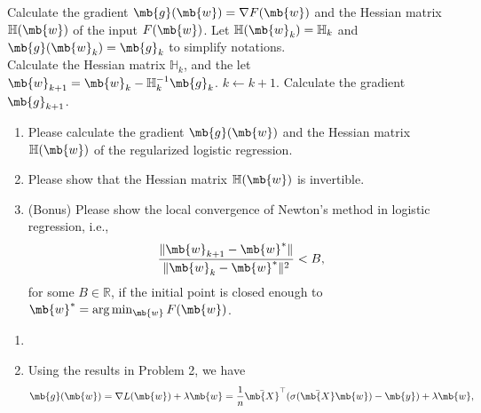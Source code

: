 \begin{exercise}
\begin{enumerate}
\begin{center}
\begin{minipage}{0.9\linewidth}
\begin{algorithm}[H]
                        \begin{algorithmic}[1]
                            \STATE Calculate the gradient $\mb{g}(\mb{w})=\nabla F(\mb{w})$ and the Hessian matrix $\mathbb{H}(\mb{w})$ of the input $F(\mb{w})$.
                            \STATE Let $\mathbb{H}(\mb{w}_k)=\mathbb{H}_{k}$ and $\mb{g}(\mb{w}_k)=\mb{g}_k$ to simplify notations. \\
                            Calculate the Hessian matrix $\mathbb{H}_k$, and the let $\mb{w}_{k+1}=\mb{w}_k-\mathbb{H}^{-1}_{k}\mb{g}_k$.
                            \STATE $k\leftarrow k+1$.
                            \STATE Calculate the gradient $\mb{g}_{k+1}$.
                            \ENDWHILE
                        \end{algorithmic}
                    \end{algorithm}
                \end{minipage}
            \end{center}
            \begin{enumerate}
                \item Please calculate the gradient $\mb{g}(\mb{w})$ and the Hessian matrix $\mathbb{H}(\mb{w})$ of the regularized logistic regression.
                \item Please show that the Hessian matrix $\mathbb{H}(\mb{w})$ is invertible.
                \item (Bonus) Please show the local convergence of Newton’s method in logistic regression, i.e.,
                    $$
                        \frac{\|\mb{w}_{k+1}-\mb{w}^{*}\|}{\|\mb{w}_{k}-\mb{w}^{*}\|^2}<B,
                    $$
                    for some $B\in\mathbb{R}$, if the initial point is closed enough to $\mb{w}^{*}=\arg \min_{\mb{w}} F(\mb{w})$.
            \end{enumerate}
            \begin{solution}
                \begin{enumerate}
                    \item []
                    \item Using the results in Problem 2, we have
                        \begin{gather*}
                            \mb{g}(\mb{w}) = \nabla L(\mb{w}) + \lambda \mb{w} =
                            \frac{1}{n} \bar{\mb{X}}^\top (\sigma(\bar{\mb{X}}\mb{w})-\mb{y}) + \lambda \mb{w}, \\

\end{gather*}
\end{enumerate}
\end{solution}
\end{enumerate}
\end{exercise}
